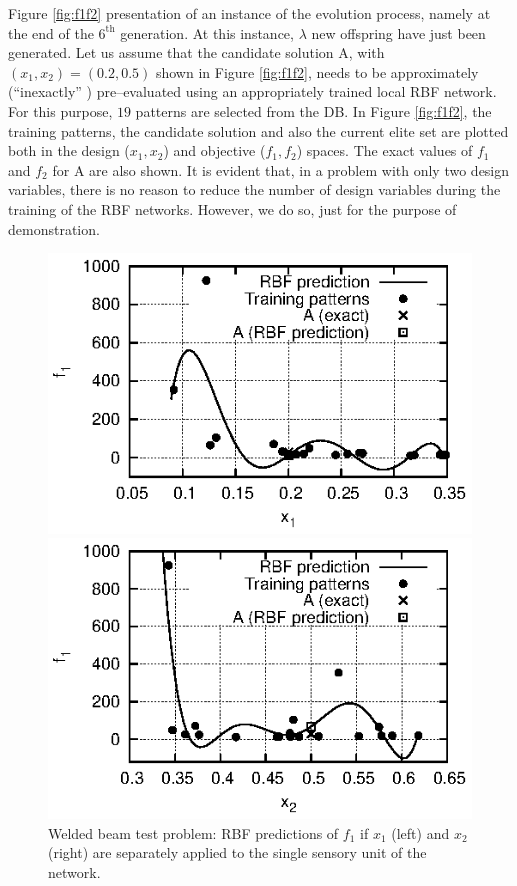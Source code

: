 Figure \ref{fig:f1f2} presentation of an instance of the evolution process, namely at the end of the $6^{\mbox{th}}$ generation. At this instance, $\lambda$ new offspring have just been generated. Let us assume that the candidate solution A, with $(x_1, x_2)\!=\!(0.2,0.5)$  shown in Figure \ref{fig:f1f2}, needs to be approximately (``inexactly'' ) pre--evaluated using an appropriately trained local RBF network. 
For this purpose, $19$ patterns are selected from the DB. 
In Figure \ref{fig:f1f2}, the training patterns, the candidate solution and also the current elite set are plotted both in the design ($x_1, x_2$) and objective ($f_1, f_2$) spaces. 
The exact values of $f_1$ and $f_2$ for A are also shown.
It is evident that, in a problem with only two design variables, there is no reason to reduce the number of design variables during the training of the RBF networks. However, we do so, just for the purpose of demonstration.  

\begin{figure}
\begin{minipage}{0.48\textwidth}
\includegraphics[scale=1.2]{IPE/f1_x1.eps}
\end{minipage}
\begin{minipage}{0.48\textwidth}
\includegraphics[scale=1.2]{IPE/f1_x2.eps}
\end{minipage}
\caption{Welded beam test problem: RBF predictions of $f_1$ if $x_1$ (left) and $x_2$ (right) are separately applied to the single sensory unit of the network. }
\label{fig:f1x1x2}
\end{figure}

